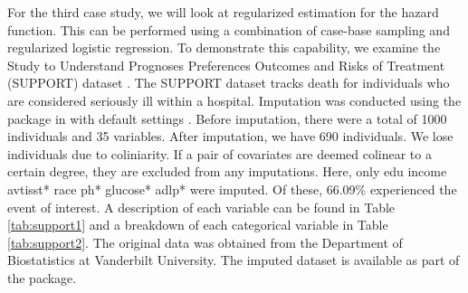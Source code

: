 \documentclass[
]{jss}
\begin{document}
For the third case study, we will look at regularized estimation for the
hazard function. This can be performed using a combination of case-base
sampling and regularized logistic regression. To demonstrate this
capability, we examine the Study to Understand Prognoses Preferences
Outcomes and Risks of Treatment (SUPPORT) dataset
\citep{knaus1995support}. The SUPPORT dataset tracks death for
individuals who are considered seriously ill within a hospital.
Imputation was conducted using the  package in 
with default settings \citep{mice}. Before imputation, there were a
total of 1000 individuals and 35 variables. After imputation, we have
690 individuals. We lose individuals due to coliniarity. If a pair of
covariates are deemed colinear to a certain degree, they are excluded
from any imputations. Here, only edu income avtisst* race ph* glucose*
adlp* were imputed. Of these, 66.09\% experienced the event of interest.
A description of each variable can be found in Table \ref{tab:support1}
and a breakdown of each categorical variable in Table
\ref{tab:support2}. The original data was obtained from the Department
of Biostatistics at Vanderbilt University. The imputed dataset is
available as part of the  package.
\end{document}
